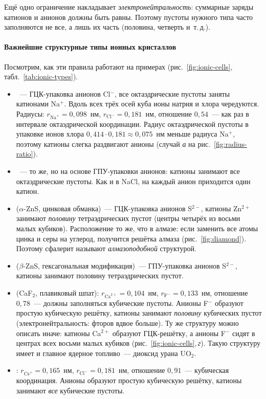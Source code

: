 Ещё одно ограничение накладывает \emph{электронейтральность}: суммарные
заряды катионов и анионов должны быть равны. Поэтому пустоты нужного
типа часто заполняются не все, а лишь их часть (половина, четверть и~т.\,д.).

\paragraph{Важнейшие структурные типы ионных кристаллов}
Посмотрим, как эти правила работают на примерах (рис.~\ref{fig:ionic-cells},
табл.~\ref{tab:ionic-types}).

\begin{itemize}
\item {}~— ГЦК-упаковка анионов Cl$^-$, все
октаэдрические пустоты заняты катионами Na$^+$. Вдоль всех трёх осей куба
ионы натрия и хлора чередуются. Радиусы: $r_{\text{Na}^+}=0{,}098$~нм,
$r_{\text{Cl}^-}=0{,}181$~нм, отношение $0{,}54$~— как раз в интервале
октаэдрической координации. Радиус октаэдрической пустоты в упаковке
ионов хлора $0{,}414\cdot0{,}181\approx0{,}075$~нм меньше радиуса Na$^+$,
поэтому катионы слегка раздвигают анионы (случай \textit{а} на
рис.~\ref{fig:radius-ratio}).
\item {}~— то же, но на основе ГПУ-упаковки анионов:
катионы занимают все октаэдрические пустоты. Как и в NaCl, на каждый
анион приходится один катион.
\item {} ($\alpha$-ZnS, цинковая обманка)~— ГЦК-упаковка
анионов S$^{2-}$, катионы Zn$^{2+}$ занимают \emph{половину}
тетраэдрических пустот (центры четырёх из восьми малых кубиков).
Расположение то же, что в алмазе: если заменить все атомы цинка и серы
на углерод, получится решётка алмаза (рис.~\ref{fig:diamond}). Поэтому
сфалерит называют \emph{алмазоподобной} структурой.
\item {} ($\beta$-ZnS, гексагональная модификация)~—
ГПУ-упаковка анионов S$^{2-}$, катионы занимают половину тетраэдрических
пустот.
\item {} (CaF$_2$, плавиковый шпат): $r_{\text{Ca}^{2+}}=0{,}104$~нм,
$r_{\text{F}^-}=0{,}133$~нм, отношение $0{,}78$~— должны заполняться
кубические пустоты. Анионы F$^-$ образуют простую кубическую решётку,
катионы занимают \emph{половину} кубических пустот (электронейтральность:
фторов вдвое больше). Ту же структуру можно описать иначе: катионы
Ca$^{2+}$ образуют ГЦК-решётку, а анионы F$^-$ сидят в центрах всех
восьми малых кубиков (рис.~\ref{fig:ionic-cells},\,\textit{г}). Такую
структуру имеет и главное ядерное топливо~— диоксид урана UO$_2$.
\item {}: $r_{\text{Cs}^+}=0{,}165$~нм,
$r_{\text{Cl}^-}=0{,}181$~нм, отношение $0{,}91$~— кубическая
координация. Анионы образуют простую кубическую решётку, катионы
занимают \emph{все} кубические пустоты.
\end{itemize}

